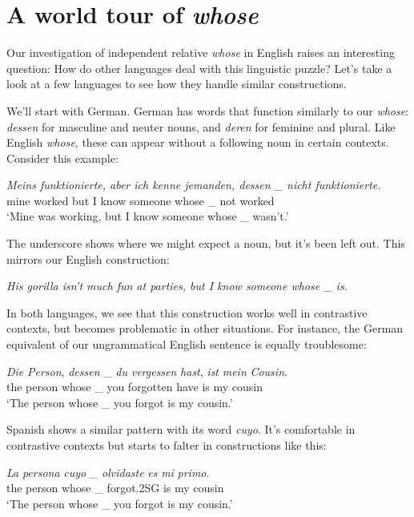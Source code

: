 \section{A world tour of \textit{whose}}

Our investigation of independent relative \textit{whose} in English raises an interesting question: How do other languages deal with this linguistic puzzle? Let's take a look at a few languages to see how they handle similar constructions.

We'll start with German. German has words that function similarly to our \textit{whose}: \textit{dessen} for masculine and neuter nouns, and \textit{deren} for feminine and plural. Like English \textit{whose}, these can appear without a following noun in certain contexts. Consider this example:

\ea \textit{Meins funktionierte, aber ich kenne jemanden, dessen \_ nicht funktionierte.}\\
    mine worked but I know someone whose \_ not worked\\
    `Mine was working, but I know someone whose \_ wasn't.'
\z

The underscore shows where we might expect a noun, but it's been left out. This mirrors our English construction:

\ea \textit{His gorilla isn't much fun at parties, but I know someone whose \_ is.}
\z

In both languages, we see that this construction works well in contrastive contexts, but becomes problematic in other situations. For instance, the German equivalent of our ungrammatical English sentence is equally troublesome:

\ea 
\gll* \textit{Die} \textit{Person}, \textit{dessen} \_ \textit{du} \textit{vergessen} \textit{hast}, \textit{ist} \textit{mein} \textit{Cousin}.\\
 {} the person whose \_ you forgotten have is my cousin\\
\glt *`The person whose \_ you forgot is my cousin.'
\z

Spanish shows a similar pattern with its word \textit{cuyo}. It's comfortable in contrastive contexts but starts to falter in constructions like this:

\ea
\gll* \textit{La} \textit{persona} \textit{cuyo} \_ \textit{olvidaste} \textit{es} \textit{mi} \textit{primo}.\\
   {} the person whose \_ forgot.2SG is my cousin\\
\glt *`The person whose \_ you forgot is my cousin.'
\z

